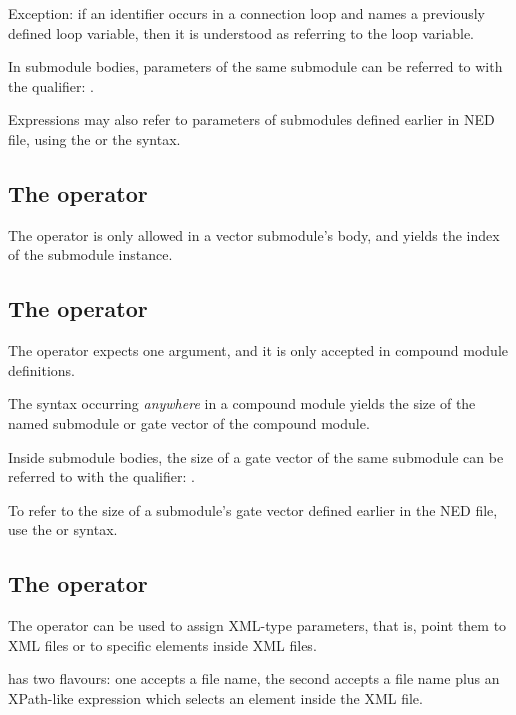 Exception: if an identifier occurs in a connection  loop and names
a previously defined loop variable, then it is understood as referring to
the loop variable.

In submodule bodies, parameters of the same submodule can be referred to
with the  qualifier: .

Expressions may also refer to parameters of submodules defined earlier
in NED file, using the  or the
 syntax.


\subsection{The  operator}

The  operator is only allowed in a vector submodule's body,
and yields the index of the submodule instance.


\subsection{The  operator}

The  operator expects one argument, and it is only accepted
in compound module definitions.

The  syntax occurring \textit{anywhere} in a compound
module yields the size of the named submodule or gate vector of the
compound module.

Inside submodule bodies, the size of a gate vector of the same submodule
can be referred to with the  qualifier: .

To refer to the size of a submodule's gate vector defined earlier in the
NED file, use the  or
 syntax.


\subsection{The  operator}

The  operator can be used to assign XML-type parameters,
that is, point them to XML files or to specific elements inside XML files.

 has two flavours: one accepts a file name, the second accepts
a file name plus an XPath-like expression which selects an element
inside the XML file.

